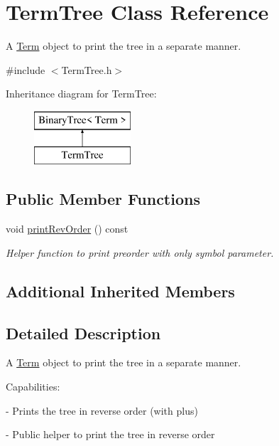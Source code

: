 \hypertarget{classTermTree}{\section{Term\-Tree Class Reference}
\label{classTermTree}
}


A \hyperlink{classTerm}{Term} object to print the tree in a separate manner.  




{\ttfamily \#include $<$Term\-Tree.\-h$>$}

Inheritance diagram for Term\-Tree\-:\begin{figure}[H]
\begin{center}
\leavevmode
\includegraphics[height=2.000000cm]{classTermTree}
\end{center}
\end{figure}
\subsection*{Public Member Functions}
\begin{DoxyCompactItemize}
\item 
void \hyperlink{classTermTree_a32250d2487444e888744a7cf76a69b54}{print\-Rev\-Order} () const 
\begin{DoxyCompactList}\small\item\em Helper function to print preorder with only symbol parameter. \end{DoxyCompactList}\end{DoxyCompactItemize}
\subsection*{Additional Inherited Members}


\subsection{Detailed Description}
A \hyperlink{classTerm}{Term} object to print the tree in a separate manner. 

Capabilities\-: \par
 -\/ Prints the tree in reverse order (with plus) \par
 -\/ Public helper to print the tree in reverse order 

